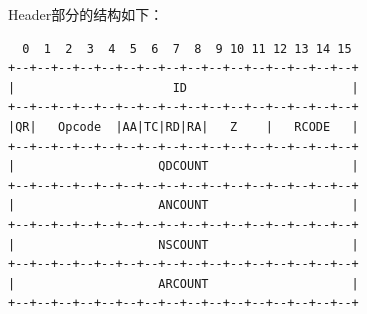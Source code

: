 \documentclass[lang=cn,11pt,a4paper,cite=authornum]{paper}
\begin{document}
Header部分的结构如下：

\begin{code}
\begin{verbatim}
  0  1  2  3  4  5  6  7  8  9 10 11 12 13 14 15
+--+--+--+--+--+--+--+--+--+--+--+--+--+--+--+--+
|                      ID                       |
+--+--+--+--+--+--+--+--+--+--+--+--+--+--+--+--+
|QR|   Opcode  |AA|TC|RD|RA|   Z    |   RCODE   |
+--+--+--+--+--+--+--+--+--+--+--+--+--+--+--+--+
|                    QDCOUNT                    |
+--+--+--+--+--+--+--+--+--+--+--+--+--+--+--+--+
|                    ANCOUNT                    |
+--+--+--+--+--+--+--+--+--+--+--+--+--+--+--+--+
|                    NSCOUNT                    |
+--+--+--+--+--+--+--+--+--+--+--+--+--+--+--+--+
|                    ARCOUNT                    |
+--+--+--+--+--+--+--+--+--+--+--+--+--+--+--+--+
\end{verbatim}
\end{code}
\end{document}

